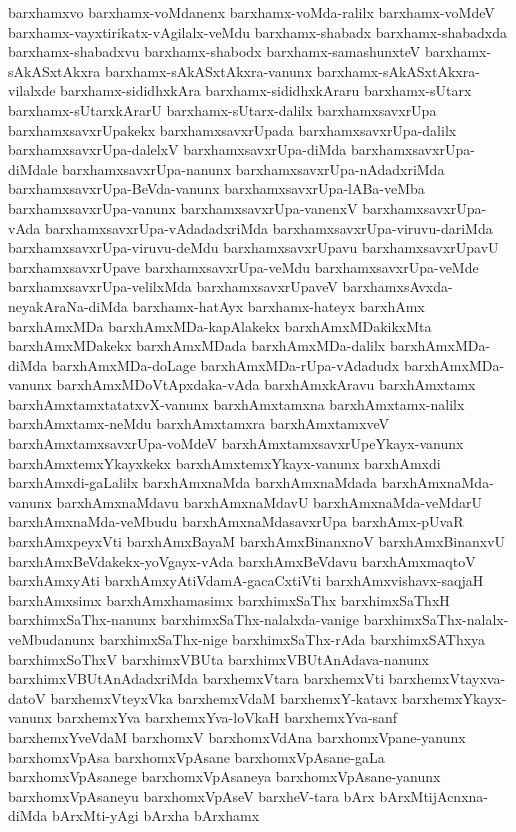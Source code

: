 {barxhamxvo
barxhamx-voMdanenx
barxhamx-voMda-ralilx
barxhamx-voMdeV
barxhamx-vayxtirikatx-vAgilalx-veMdu
barxhamx-shabadx
barxhamx-shabadxda
barxhamx-shabadxvu
barxhamx-shabodx
barxhamx-samashunxteV
barxhamx-sAkASxtAkxra
barxhamx-sAkASxtAkxra-vanunx
barxhamx-sAkASxtAkxra-vilalxde
barxhamx-sididhxkAra
barxhamx-sididhxkAraru
barxhamx-sUtarx
barxhamx-sUtarxkArarU
barxhamx-sUtarx-dalilx
barxhamxsavxrUpa
barxhamxsavxrUpakekx
barxhamxsavxrUpada
barxhamxsavxrUpa-dalilx
barxhamxsavxrUpa-dalelxV
barxhamxsavxrUpa-diMda
barxhamxsavxrUpa-diMdale
barxhamxsavxrUpa-nanunx
barxhamxsavxrUpa-nAdadxriMda
barxhamxsavxrUpa-BeVda-vanunx
barxhamxsavxrUpa-lABa-veMba
barxhamxsavxrUpa-vanunx
barxhamxsavxrUpa-vanenxV
barxhamxsavxrUpa-vAda
barxhamxsavxrUpa-vAdadadxriMda
barxhamxsavxrUpa-viruvu-dariMda
barxhamxsavxrUpa-viruvu-deMdu
barxhamxsavxrUpavu
barxhamxsavxrUpavU
barxhamxsavxrUpave
barxhamxsavxrUpa-veMdu
barxhamxsavxrUpa-veMde
barxhamxsavxrUpa-velilxMda
barxhamxsavxrUpaveV
barxhamxsAvxda-neyakAraNa-diMda
barxhamx-hatAyx
barxhamx-hateyx
barxhAmx
barxhAmxMDa
barxhAmxMDa-kapAlakekx
barxhAmxMDakikxMta
barxhAmxMDakekx
barxhAmxMDada
barxhAmxMDa-dalilx
barxhAmxMDa-diMda
barxhAmxMDa-doLage
barxhAmxMDa-rUpa-vAdadudx
barxhAmxMDa-vanunx
barxhAmxMDoVtApxdaka-vAda
barxhAmxkAravu
barxhAmxtamx
barxhAmxtamxtatatxvX-vanunx
barxhAmxtamxna
barxhAmxtamx-nalilx
barxhAmxtamx-neMdu
barxhAmxtamxra
barxhAmxtamxveV
barxhAmxtamxsavxrUpa-voMdeV
barxhAmxtamxsavxrUpeYkayx-vanunx
barxhAmxtemxYkayxkekx
barxhAmxtemxYkayx-vanunx
barxhAmxdi
barxhAmxdi-gaLalilx
barxhAmxnaMda
barxhAmxnaMdada
barxhAmxnaMda-vanunx
barxhAmxnaMdavu
barxhAmxnaMdavU
barxhAmxnaMda-veMdarU
barxhAmxnaMda-veMbudu
barxhAmxnaMdasavxrUpa
barxhAmx-pUvaR
barxhAmxpeyxVti
barxhAmxBayaM
barxhAmxBinanxnoV
barxhAmxBinanxvU
barxhAmxBeVdakekx-yoVgayx-vAda
barxhAmxBeVdavu
barxhAmxmaqtoV
barxhAmxyAti
barxhAmxyAtiVdamA-gacaCxtiVti
barxhAmxvishavx-saqjaH
barxhAmxsimx
barxhAmxhamasimx
barxhimxSaThx
barxhimxSaThxH
barxhimxSaThx-nanunx
barxhimxSaThx-nalalxda-vanige
barxhimxSaThx-nalalx-veMbudanunx
barxhimxSaThx-nige
barxhimxSaThx-rAda
barxhimxSAThxya
barxhimxSoThxV
barxhimxVBUta
barxhimxVBUtAnAdava-nanunx
barxhimxVBUtAnAdadxriMda
barxhemxVtara
barxhemxVti
barxhemxVtayxva-datoV
barxhemxVteyxVka
barxhemxVdaM
barxhemxY-katavx
barxhemxYkayx-vanunx
barxhemxYva
barxhemxYva-loVkaH
barxhemxYva-sanf
barxhemxYveVdaM
barxhomxV
barxhomxVdAna
barxhomxVpane-yanunx
barxhomxVpAsa
barxhomxVpAsane
barxhomxVpAsane-gaLa
barxhomxVpAsanege
barxhomxVpAsaneya
barxhomxVpAsane-yanunx
barxhomxVpAsaneyu
barxhomxVpAseV
barxheV-tara
bArx
bArxMtijAcnxna-diMda
bArxMti-yAgi
bArxha
bArxhamx
}
